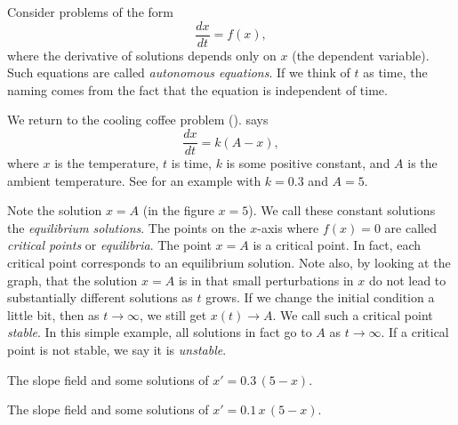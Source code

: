 
Consider
problems of the form
\begin{equation*}
\frac{dx}{dt} = f(x) ,
\end{equation*}
where the derivative of solutions depends only on $x$ (the dependent
variable).  Such equations are called \emph{autonomous
equations}.  If we think
of $t$ as time, the naming comes from the fact that the equation is
independent of time.

We return to the cooling coffee problem
().
says
\begin{equation*}
\frac{dx}{dt} = k (A-x) ,
\end{equation*}
where $x$ is the temperature, $t$ is time, $k$ is some positive constant,
and $A$ is
the ambient temperature.  See  for an example
with $k=0.3$ and $A=5$.

Note the solution $x=A$ (in the figure $x=5$).
We call these constant solutions the
\emph{equilibrium solutions}.
The points on the $x$-axis where $f(x) = 0$ are called
\emph{critical points} or
\emph{equilibria}.
The point $x=A$ is a critical point.
In fact, each
critical point corresponds to an equilibrium solution.
Note also, by looking at the graph, that the solution $x=A$ is
 in
that small perturbations in $x$ do not lead to substantially different
solutions as $t$ grows.
If we change the initial condition a little bit, then as 
$t \to \infty$, we still get $x(t) \to A$.
We call such a critical point
\emph{stable}.
In this simple example, all solutions in fact go to $A$
as $t \to \infty$.  If a critical point is not stable, we say it is
\emph{unstable}.

\begin{myfig}
\parbox[t]{3.0in}{
 \capstart
 \caption{The slope field and some solutions of
 $x' = 0.3\,(5-x)$.\label{2.2:coffeefig}}
}
\quad
\parbox[t]{3.0in}{
 \capstart
 \caption{The slope field and some solutions of
 $x' = 0.1\,x\,(5-x)$.\label{2.2:logisticfig}}
}
\end{myfig}

